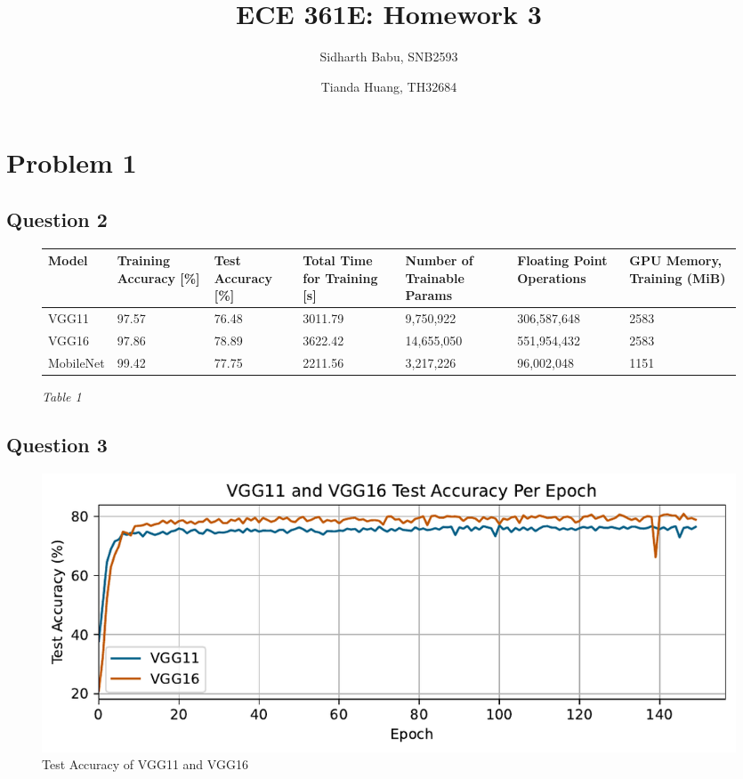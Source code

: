\documentclass{article}
\author{Sidharth Babu, SNB2593 \and Tianda Huang, TH32684}
\title{ECE 361E: Homework 3}
\begin{document}
\begin{mdframed}
    \maketitle
\end{mdframed}
\pagebreak

\section*{Problem 1}
\subsection*{Question 2}
\begin{figure}[!htb]
    \caption{\textit{Table 1}}
    \begin{tabularx}{\textwidth}{|*{7}{Y|}}
        \hline
        Model & Training Accuracy [\%] & Test Accuracy [\%] & Total Time for Training [s] & Number of Trainable Params & Floating Point Operations & GPU Memory, Training (MiB)\\
        \hline
        VGG11 & 97.57 & 76.48 & 3011.79 & 9,750,922 & 306,587,648 & 2583 \\
        \hline
        VGG16 & 97.86 & 78.89 & 3622.42 & 14,655,050 & 551,954,432 & 2583 \\
        \hline
        MobileNet & 99.42 & 77.75 & 2211.56 & 3,217,226 & 96,002,048 & 1151\\
        \hline
    \end{tabularx}
    \label{fig:model-summary}
\end{figure}

\subsection*{Question 3}
\begin{figure}[!htb]
    \centering
    \includegraphics[width=\textwidth]{vgg11_16_acc.pdf}
    \caption{Test Accuracy of VGG11 and VGG16}
    \label{fig:vgg-epoch-accuracy}
\end{figure}
\end{document}
